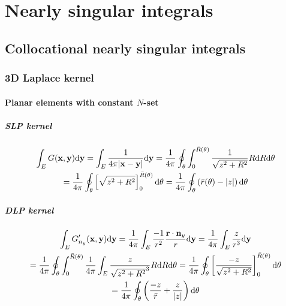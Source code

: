 \chapter{Nearly singular integrals}
\label{sec:nearly_singular}

\section{Collocational nearly singular integrals}

\subsection{3D Laplace kernel}

\subsubsection{Planar elements with constant $N$-set}

\paragraph{SLP kernel}

\begin{multline}
	\int_E G({\bf x}, {\bf y}) \mathrm{d} {\bf y}
	= \int_E \frac{1}{4\pi |{\bf x} - {\bf y}|} \mathrm{d} {\bf y}
	= \frac{1}{4\pi} \oint_{\theta} \int_{0}^{\bar{R}(\theta)} \frac{1}{\sqrt{z^2 + R^2}} R \mathrm{d} R \mathrm{d} \theta
	\\
	= \frac{1}{4\pi} \oint_{\theta} \left[ \sqrt{z^2 + R^2} \right]_{0}^{\bar{R}(\theta)} \mathrm{d} \theta
	= \frac{1}{4\pi} \oint_{\theta} \left( \bar{r}(\theta) - |z| \right) \mathrm{d} \theta
\end{multline}

\paragraph{DLP kernel}

\begin{multline}
	\int_E G'_{n_y}({\bf x}, {\bf y}) \mathrm{d} {\bf y}
	= \frac{1}{4\pi} \int_E \frac{-1}{r^2} \frac{{\bf r} \cdot {\bf n}_y}{r} \mathrm{d} {\bf y}
	= \frac{1}{4\pi} \int_E \frac{z}{r^3} \mathrm{d} {\bf y}
	\\
	= \frac{1}{4\pi} \oint_{\theta} \int_{0}^{\bar{R}(\theta)} \frac{1}{4\pi} \int_E \frac{z}{\sqrt{z^2 + R^2}^3} R \mathrm{d} R \mathrm{d} \theta
	= \frac{1}{4\pi} \oint_{\theta} \left[ \frac{-z}{\sqrt{z^2 + R^2}} \right]_{0}^{\bar{R}(\theta)} \mathrm{d} \theta \\
	= \frac{1}{4\pi} \oint_{\theta} \left( \frac{-z}{\bar{r}} + \frac{z}{|z|} \right) \mathrm{d} \theta
\end{multline}

